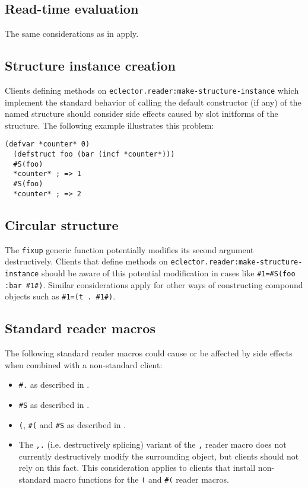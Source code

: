 \subsection{Read-time evaluation}
\label{sec:non-default-read-time-evaluation}

The same considerations as in
 apply.

\subsection{Structure instance creation}
\label{sec:non-default-structure-instance-creation}

Clients defining methods on
\texttt{eclector.reader:make-structure-instance} which implement the
standard behavior of calling the default constructor (if any) of the
named structure should consider side effects caused by slot initforms
of the structure.  The following example illustrates this problem:
\begin{Verbatim}[frame=single]
  (defvar *counter* 0)
  (defstruct foo (bar (incf *counter*)))
  #S(foo)
  *counter* ; => 1
  #S(foo)
  *counter* ; => 2
\end{Verbatim}

\subsection{Circular structure}
\label{sec:circular-structure}

The \texttt{fixup} generic function potentially modifies its second
argument destructively.  Clients that define methods on
\texttt{eclector.reader:make-structure-instance} should be aware of
this potential modification in cases like \texttt{\#1=\#S(foo :bar
  \#1\#)}.  Similar considerations apply for other ways of
constructing compound objects such as \texttt{\#1=(t . \#1\#)}.

\subsection{Standard reader macros}
\label{sec:non-default-standard-reader-macros}

The following standard reader macros could cause or be affected by
side effects when combined with a non-standard client:

\begin{itemize}
\item \texttt{\#.} as described in
  .
\item \texttt{\#S} as described in
  .
\item \texttt{(}, \texttt{\#(} and \texttt{\#S} as described in
  .
\item The \texttt{,.} (i.e. destructively splicing) variant of the
  \texttt{,} reader macro does not currently destructively modify the
  surrounding object, but clients should not rely on this fact.  This
  consideration applies to clients that install non-standard macro
  functions for the \texttt{(} and \texttt{\#(} reader macros.
\end{itemize}
